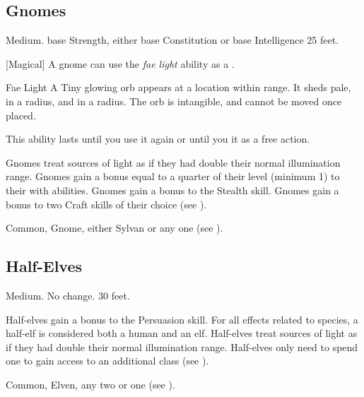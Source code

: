     \subsection{Gnomes}
         Medium.
          base Strength, either  base Constitution or  base Intelligence
         25 feet.
        \begin{raggeditemize}
            [Magical] A gnome can use the \textit{fae light} ability as a .
                \begin{freeability}{Fae Light}
                    A Tiny glowing orb appears at a location within \rngmed range.
                    It sheds pale,  in a \areasmall radius, and  in a \areamed radius.
                    The orb is intangible, and cannot be moved once placed.

                    This ability lasts until you use it again or until you  it as a free action.
                \end{freeability}
             Gnomes treat sources of light as if they had double their normal illumination range.
             Gnomes gain a bonus equal to a quarter of their level (minimum 1) to their  with  abilities.
             Gnomes gain a  bonus to the Stealth skill.
             Gnomes gain a  bonus to two Craft skills of their choice (see ).
        \end{raggeditemize}
         Common, Gnome, either Sylvan or any one  (see ).

    \subsection{Half-Elves}\label{Half-Elves}
         Medium.
         No change.
         30 feet.
        \begin{raggeditemize}
             Half-elves gain a  bonus to the Persuasion skill.
             For all effects related to species, a half-elf is considered both a human and an elf.
             Half-elves treat sources of light as if they had double their normal illumination range.
             Half-elves only need to spend one  to gain access to an additional class (see ).
        \end{raggeditemize}
         Common, Elven, any two  or one  (see ).

